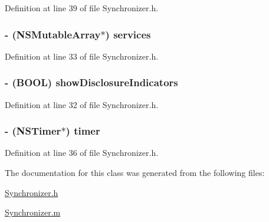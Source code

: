 Definition at line 39 of file Synchronizer.h.

\hypertarget{interface_synchronizer_a7f90b977eaa3f12507bc0a97480c4e78}{
\subsubsection[{services}]{\setlength{\rightskip}{0pt plus 5cm}-\/ (NSMutableArray$\ast$) services}}
\label{interface_synchronizer_a7f90b977eaa3f12507bc0a97480c4e78}


Definition at line 33 of file Synchronizer.h.

\hypertarget{interface_synchronizer_a203153a42b054a34a39087fee7eeab93}{
\subsubsection[{showDisclosureIndicators}]{\setlength{\rightskip}{0pt plus 5cm}-\/ (BOOL) showDisclosureIndicators}}
\label{interface_synchronizer_a203153a42b054a34a39087fee7eeab93}


Definition at line 32 of file Synchronizer.h.

\hypertarget{interface_synchronizer_a49efd1a3e05e38497c176a4e11fdbaab}{
\subsubsection[{timer}]{\setlength{\rightskip}{0pt plus 5cm}-\/ (NSTimer$\ast$) timer}}
\label{interface_synchronizer_a49efd1a3e05e38497c176a4e11fdbaab}


Definition at line 36 of file Synchronizer.h.



The documentation for this class was generated from the following files:\begin{DoxyCompactItemize}
\item 
\hyperlink{_synchronizer_8h}{Synchronizer.h}\item 
\hyperlink{_synchronizer_8m}{Synchronizer.m}\end{DoxyCompactItemize}
